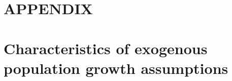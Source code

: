 \documentclass[letterpaper,12pt]{article}
\theoremstyle{definition}
\begin{document}
\newpage



\newpage
\renewcommand{\theequation}{A.\arabic{section}.\arabic{equation}}
\renewcommand{\thesection}{A-\arabic{section}}   %
\setcounter{equation}{0}                         %
\setcounter{section}{0}                          %
\section*{APPENDIX}                              %

\section{Characteristics of exogenous population growth assumptions}\label{AppPopGrowth}
\end{document}
